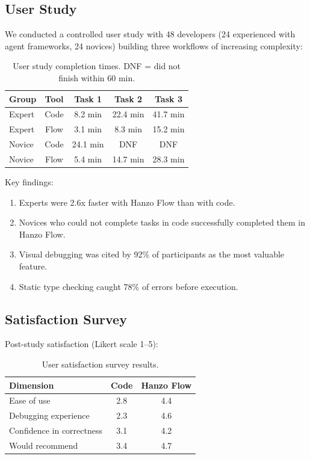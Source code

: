 \subsection{User Study}

We conducted a controlled user study with 48 developers (24 experienced with agent frameworks, 24 novices) building three workflows of increasing complexity:

\begin{table}[H]
\centering
\small
\begin{tabular}{lcccc}
\toprule
\textbf{Group} & \textbf{Tool} & \textbf{Task 1} & \textbf{Task 2} & \textbf{Task 3} \\
\midrule
Expert & Code & 8.2 min & 22.4 min & 41.7 min \\
Expert & Flow & 3.1 min & 8.3 min & 15.2 min \\
Novice & Code & 24.1 min & DNF & DNF \\
Novice & Flow & 5.4 min & 14.7 min & 28.3 min \\
\bottomrule
\end{tabular}
\caption{User study completion times. DNF = did not finish within 60 min.}
\label{tab:userstudy}
\end{table}

Key findings:
\begin{enumerate}[leftmargin=1.4em]
    \item Experts were 2.6x faster with Hanzo Flow than with code.
    \item Novices who could not complete tasks in code successfully completed them in Hanzo Flow.
    \item Visual debugging was cited by 92\% of participants as the most valuable feature.
    \item Static type checking caught 78\% of errors before execution.
\end{enumerate}

\subsection{Satisfaction Survey}

Post-study satisfaction (Likert scale 1--5):

\begin{table}[H]
\centering
\small
\begin{tabular}{lcc}
\toprule
\textbf{Dimension} & \textbf{Code} & \textbf{Hanzo Flow} \\
\midrule
Ease of use & 2.8 & 4.4 \\
Debugging experience & 2.3 & 4.6 \\
Confidence in correctness & 3.1 & 4.2 \\
Would recommend & 3.4 & 4.7 \\
\bottomrule
\end{tabular}
\caption{User satisfaction survey results.}
\label{tab:satisfaction}
\end{table}

